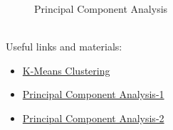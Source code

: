 \documentclass[11pt]{article}
\begin{document}
\begin{figure}[h!]
    {\caption*{Principal Component Analysis}}%
    \label{fig:example}%
\end{figure}\\
Useful links and materials:
\begin{itemize}
\item \href{https://www.youtube.com/watch?v=hDmNF9JG3lo}{K-Means Clustering}
\item \href{https://www.youtube.com/watch?v=T-B8muDvzu0}{Principal Component Analysis-1}
\item \href{https://www.youtube.com/watch?v=rng04VJxUt4}{Principal Component Analysis-2}
\end{itemize}
\pagebreak
\end{document}
